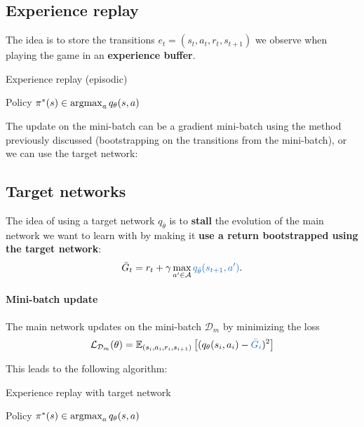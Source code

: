\documentclass[../course-notes.tex]{subfiles}
\begin{document}
\subsection{Experience replay}

The idea is to store the transitions $e_t = (s_t, a_t, r_t, s_{t+1})$ we observe when playing the game in an \textbf{experience buffer}.

\begin{algorithm}
\caption{Experience replay (episodic)}
\Return Policy $\pi^*(s) \in \operatorname*{\mathrm{argmax}}_a q_\theta(s,a)$\;
\end{algorithm}

The update on the mini-batch can be a gradient mini-batch using the method previously discussed (bootstrapping on the transitions from the mini-batch), or we can use the target network:

\subsection{Target networks}

The idea of using a target network $q_{\bar\theta}$ is to \textbf{stall} the evolution of the main network we want to learn with by making it \textbf{use a return bootstrapped using the target network}:
\[
	\bar G_t = r_t + \gamma \max_{a'\in\calA} {\bluefont q_{\bar\theta}(s_{t+1}, a')}.
\]

\paragraph{Mini-batch update} The main network updates on the mini-batch $\mathcal{D}_m$ by minimizing the loss
\begin{equation}
	\calL_{\mathcal{D}_m}(\theta) =
	\EE_{(s_i,a_i,r_i,s_{i+1})}
	\left[
	(q_\theta(s_i, a_i) - {\bluefont \bar{G}_i})^2
	\right]
\end{equation}



This leads to the following algorithm:
\begin{algorithm}
\caption{Experience replay with target network}
\Return Policy $\pi^*(s) \in \operatorname*{\mathrm{argmax}}_a q_\theta(s,a)$\;
\end{algorithm}
\end{document}
